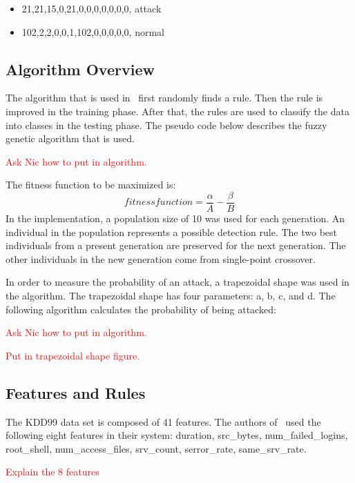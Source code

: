 \documentclass{sig-alternate}
\newcommand{\mycomment}[1]{\textcolor{red}{#1}}
\begin{document}
\begin{itemize}
\item 21,21,15,0,21,0,0,0,0,0,0,0, attack
\item 102,2,2,0,0,1,102,0,0,0,0,0, normal
\end{itemize}




\subsection{Algorithm Overview}
The algorithm that is used in~\cite{6496342, 6559603} first randomly finds a rule. Then the rule is improved in the training phase. After that, the rules are used to classify the data into classes in the testing phase. The pseudo code below describes the fuzzy genetic algorithm that is used. 

\mycomment{Ask Nic how to put in algorithm.}

The fitness function to be maximized is:
\begin{equation*}
fitness function = \frac{\alpha}{A} - \frac{\beta}{B}
\end{equation*}
In the implementation, a population size of 10 was used for each generation. An individual in the population represents a possible detection rule. The two best individuals from a present generation are preserved for the next generation. The other individuals in the new generation come from single-point crossover.



In order to measure the probability of an attack, a trapezoidal shape was used in the algorithm. The trapezoidal shape has four parameters: a, b, c, and d. The following algorithm calculates the probability of being attacked:

\mycomment{Ask Nic how to put in algorithm.}

\mycomment{Put in trapezoidal shape figure.}




\subsection{Features and Rules}
The KDD99 data set is composed of 41 features. The authors of~\cite{6496342, 6559603} used the following eight features in their system: duration, src\_bytes, num\_failed\_logins, root\_shell, num\_access\_files, srv\_count, serror\_rate, same\_srv\_rate.

\mycomment{Explain the 8 features}
\end{document}
